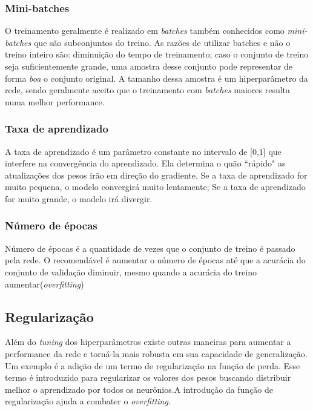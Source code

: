 \subsubsection{Mini-batches}
O treinamento geralmente é realizado em \textit{batches} também conhecidos como \textit{mini-batches} que são subconjuntos do treino. As razões de utilizar batches e não o treino inteiro são: diminuição do tempo de treinamento; caso o conjunto de treino seja suficientemente grande, uma amostra desse conjunto pode representar de forma \textit{boa} o conjunto original. A tamanho dessa amostra é um hiperparâmetro da rede, sendo geralmente aceito que o treinamento com \textit{batches} maiores resulta numa melhor performance.

\subsubsection{Taxa de aprendizado}

A taxa de aprendizado é um parâmetro constante no intervalo de [0,1] que interfere na convergência do aprendizado. Ela determina o quão ``rápido" as atualizações dos pesos irão em direção do gradiente. Se a taxa de aprendizado for muito pequena, o modelo convergirá muito lentamente; Se a taxa de aprendizado for muito grande, o modelo irá divergir. 

\subsubsection{Número de épocas}
Número de épocas é a quantidade de vezes que o conjunto de treino é passado pela rede. O recomendável é aumentar o número de épocas até que a acurácia do conjunto de validação diminuir, mesmo quando a acurácia do treino aumentar(\textit{overfitting})

\subsection{Regularização}

Além do \textit{tuning} dos hiperparâmetros existe outras maneiras para aumentar a performance da rede e torná-la mais robusta em sua capacidade de generalização. 
Um exemplo é a adição de um termo de regularização na função de perda. Esse termo é introduzido para regularizar os valores dos pesos buscando distribuir melhor o aprendizado por todos os neurônios.A introdução da função de regularização ajuda a combater o \textit{overfitting}. %

